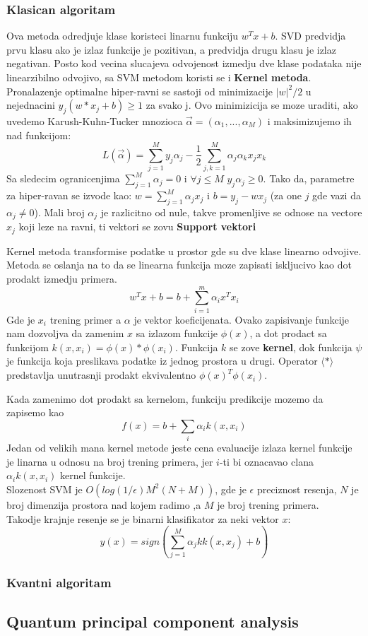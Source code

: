 \documentclass[12pt, letterpaper, oneside]{article}
\begin{document}
\subsubsection{Klasican algoritam}
Ova metoda odredjuje klase koristeci linarnu funkciju $w^{T}x + b$. SVD predvidja prvu klasu ako je izlaz funkcije je pozitivan, a predvidja drugu klasu je izlaz negativan.
Posto kod vecina slucajeva odvojenost izmedju dve klase podataka nije linearzibilno odvojivo, sa SVM metodom koristi se i \textbf{Kernel metoda}. \\
Pronalazenje optimalne hiper-ravni se sastoji od minimizacije $|w|^{2}/2$ u nejednacini $y_j(w*x_j+b) \geq 1$ za svako j. 
Ovo minimizicija se moze uraditi, ako uvedemo Karush-Kuhn-Tucker mnozioca $\overrightarrow{\alpha} = (\alpha_1,...,\alpha_M)$ i maksimizujemo ih nad funkcijom:
\[
    L(\overrightarrow{\alpha}) = \sum_{j=1}^{M}{y_j\alpha_j} - \frac{1}{2}\sum_{j,k=1}^{M}{\alpha_j\alpha_kx_jx_k}
\]
Sa sledecim ogranicenjima $\sum_{j=1}^{M}{\alpha_j=0}$ i $\forall j \leq M $ $y_j\alpha_j \geq 0$. Tako da, parametre za hiper-ravan se izvode kao:
$w = \sum_{j=1}^{M}\alpha_jx_j$ i $b = y_j - wx_j$ (za one $j$ gde vazi da $\alpha_j \neq 0$). Mali broj $\alpha_j$ je razlicitno od nule, takve promenljive se odnose na vectore $x_j$ koji leze na ravni,
ti vektori se zovu \textbf{Support vektori} \cite{rebentrost2014quantum}

Kernel metoda transformise podatke u prostor gde su dve klase linearno odvojive. Metoda se oslanja na to da se linearna funkcija
moze zapisati iskljucivo kao dot prodakt izmedju primera.
\[
    w^{T}x + b = b + \sum_{i=1}^m \alpha_ix^Tx_i
\]
Gde je $x_i$ trening primer a $\alpha$ je vektor koeficijenata. Ovako zapisivanje funkcije nam dozvoljva da zamenim $x$ sa izlazom funkcije $\phi(x)$, a dot prodact sa funkcijom $k(x,x_i) = \phi(x)*\phi(x_i)$.
Funkcija $k$ se zove \textbf{kernel}, dok funkcija $\psi$ je funkcija koja preslikava podatke iz jednog prostora u drugi. Operator $\langle * \rangle$ predstavlja unutrasnji prodakt ekvivalentno $\phi(x)^T\phi(x_i)$. \cite{goodfellow2016deep}

Kada zamenimo dot prodakt sa kernelom, funkciju predikcije mozemo da zapisemo kao
\[
    f(x) = b + \sum_i \alpha_{i}k(x,x_i)
\]
Jedan od velikih mana kernel metode jeste cena evaluacije izlaza kernel funkcije je linarna u odnosu na broj trening primera, jer $i$-ti bi oznacavao clana $\alpha_ik(x,x_i)$ kernel funkcije. \cite{goodfellow2016deep} \\
Slozenost SVM je $O(log(1/\epsilon)M^2(N+M))$, gde je $\epsilon$ preciznost resenja, $N$ je broj dimenzija prostora nad kojem radimo ,a $M$ je broj trening primera. \\
Takodje krajnje resenje se je binarni klasifikator za neki vektor $x$:
\[
    y(x) = sign(\sum_{j=1}^{M}\alpha_jkk(x,x_j) + b)
\]

\subsubsection{Kvantni algoritam}

\subsection{Quantum principal component analysis}

\newpage
\printbibliography
\end{document}
